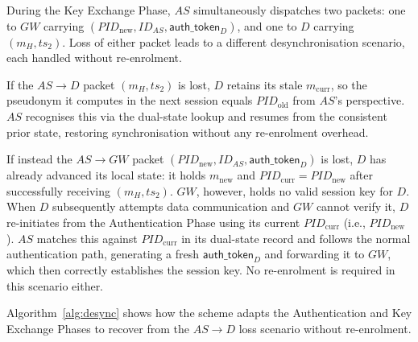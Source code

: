 During the Key Exchange Phase, $AS$ simultaneously dispatches two packets: one to
$GW$ carrying $(\mathit{PID}_{\mathrm{new}}, ID_{AS}, \mathsf{auth\_token}_D)$,
and one to $D$ carrying $(m_H, ts_2)$.
Loss of either packet leads to a different desynchronisation scenario, each handled
without re-enrolment.

If the $AS \to D$ packet $(m_H, ts_2)$ is lost, $D$ retains its stale
$m_{\mathrm{curr}}$, so the pseudonym it computes in the next session equals
$\mathit{PID}_{\mathrm{old}}$ from $AS$'s perspective.
$AS$ recognises this via the dual-state lookup and resumes from the consistent prior
state, restoring synchronisation without any re-enrolment overhead.

If instead the $AS \to GW$ packet
$(\mathit{PID}_{\mathrm{new}}, ID_{AS}, \mathsf{auth\_token}_D)$ is lost, $D$ has
already advanced its local state: it holds $m_{\mathrm{new}}$ and
$\mathit{PID}_{\mathrm{curr}} = \mathit{PID}_{\mathrm{new}}$ after successfully
receiving $(m_H, ts_2)$.
$GW$, however, holds no valid session key for $D$.
When $D$ subsequently attempts data communication and $GW$ cannot verify it, $D$
re-initiates from the Authentication Phase using its current
$\mathit{PID}_{\mathrm{curr}}$ (i.e., $\mathit{PID}_{\mathrm{new}}$).
$AS$ matches this against $\mathit{PID}_{\mathrm{curr}}$ in its dual-state record
and follows the normal authentication path, generating a fresh
$\mathsf{auth\_token}_D$ and forwarding it to $GW$, which then correctly
establishes the session key.
No re-enrolment is required in this scenario either.

Algorithm~\ref{alg:desync} shows how the scheme adapts the Authentication and Key
Exchange Phases to recover from the $AS \to D$ loss scenario without re-enrolment.

